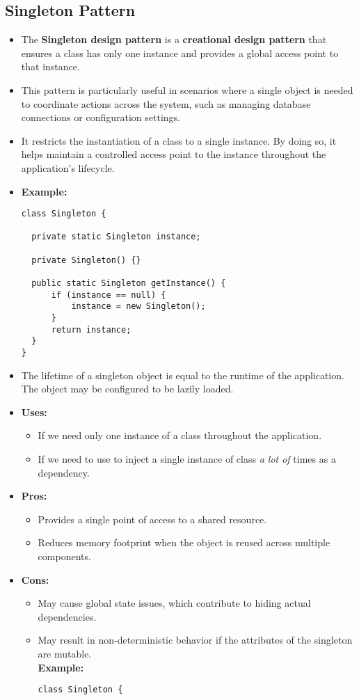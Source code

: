 \documentclass{article}
\begin{document}
\subsection{Singleton Pattern}
\begin{itemize}
    \item The \textbf{Singleton design pattern} is a \textbf{creational design pattern} that ensures a class has only one instance and provides a global access point to that instance.
    \item This pattern is particularly useful in scenarios where a single object is needed to coordinate actions across the system, such as managing database connections or configuration settings.
    \item It restricts the instantiation of a class to a single instance. By doing so, it helps maintain a controlled access point to the instance throughout the application's lifecycle.
    \item \textbf{Example:}
          \begin{verbatim}
class Singleton {

  private static Singleton instance;

  private Singleton() {}

  public static Singleton getInstance() {
      if (instance == null) {
          instance = new Singleton();
      }
      return instance;
  }
}
          \end{verbatim}
    \item The lifetime of a singleton object is equal to the runtime of the application. The object may be configured to be lazily loaded.
    \item \textbf{Uses:}
    \begin{itemize}
      \item If we need only one instance of a class throughout the application.
      \item If we need to use to inject a single instance of class \textit{a lot of} times as a dependency.
    \end{itemize}
    \item \textbf{Pros:}
          \begin{itemize}
              \item Provides a single point of access to a shared resource.
              \item Reduces memory footprint when the object is reused across multiple components.
          \end{itemize}
    \item \textbf{Cons:}
          \begin{itemize}
              \item May cause global state issues, which contribute to hiding actual dependencies.
              \item May result in non-deterministic behavior if the attributes of the singleton are mutable. \\
                    \textbf{Example:}
                    \begin{verbatim}
class Singleton {


\end{verbatim}
\end{itemize}
\end{itemize}
\end{document}
